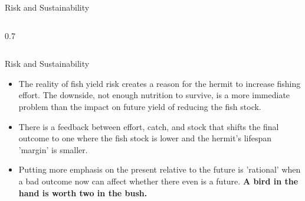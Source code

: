 \begin{frame}{Risk and Sustainability}
\begin{columns}[T]
\begin{column}{0.7\textwidth}
		\end{column}
	\end{columns}
\end{frame}


\begin{frame}{Risk and Sustainability}
	\begin{itemize}
		\item The reality of fish yield risk creates a reason for the hermit to increase fishing effort.  The downside, not enough nutrition to survive, is a more immediate problem than the impact on future yield of reducing the fish stock.
		\item There is a feedback between effort, catch, and stock that shifts the final outcome to one where the fish stock is lower and the hermit's lifespan 'margin' is smaller.
		\item Putting more emphasis on the present relative to the future is 'rational' when a bad outcome now can affect whether there even is a future. \vskip 12pt
		\centering
		\large{\textbf{A bird in the hand is worth two in the bush.}}
	\end{itemize}
\end{frame}

